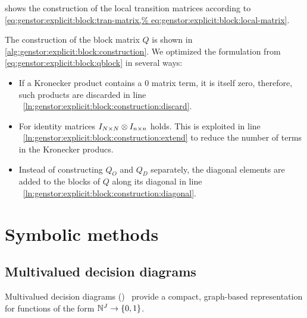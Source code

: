 shows the construction of
the local transition matrices according to
\cref{eq:genstor:explicit:block:tran-matrix,%
eq:genstor:explicit:block:local-matrix}.

The construction of the block matrix $Q$ is shown in
\vref{alg:genstor:explicit:block:construction}. We optimized the formulation from
\cref{eq:genstor:explicit:block:qblock} in several ways:
\begin{itemize}
\item If a Kronecker product contains a $0$ matrix term, it is itself
  zero, therefore, such products are discarded in line%
  ~\ref{ln:genstor:explicit:block:construction:discard}.
\item For identity matrices $I_{N \times N} \otimes I_{n \times n}$
  holds. This is exploited in line%
  ~\ref{ln:genstor:explicit:block:construction:extend} to reduce the
  number of terms in the Kronecker producs.
\item Instead of constructing $Q_O$ and $Q_D$ separately, the diagonal
  elements are added to the blocks of $Q$ along its diagonal in line%
  ~\ref{ln:genstor:explicit:block:construction:diagonal}.
\end{itemize}

\section{Symbolic methods}

\subsection{Multivalued decision diagrams}

Multivalued decision diagrams ()~\citep{Ciardo:2006}
provide a compact, graph-based representation for functions of the
form $\mathbb{N}^J \to \{0, 1\}$.

